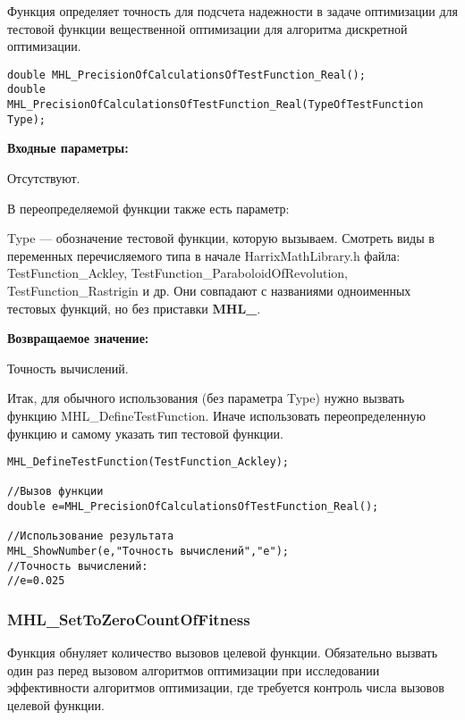 \documentclass[a4paper,12pt]{article}
\begin{document}
Функция определяет точность для подсчета надежности в задаче оптимизации для тестовой функции вещественной оптимизации для алгоритма дискретной оптимизации.


\begin{lstlisting}[label=code_syntax_MHL_PrecisionOfCalculationsOfTestFunction_Real,caption=Синтаксис]
double MHL_PrecisionOfCalculationsOfTestFunction_Real();
double MHL_PrecisionOfCalculationsOfTestFunction_Real(TypeOfTestFunction Type);
\end{lstlisting}

\textbf{Входные параметры:}

Отсутствуют.

В переопределяемой функции также есть параметр:
  
Type --- обозначение тестовой функции, которую вызываем.
Смотреть виды в переменных перечисляемого типа в начале HarrixMathLibrary.h файла: TestFunction\_Ackley, TestFunction\_ParaboloidOfRevolution, TestFunction\_Rastrigin и др. Они совпадают с названиями одноименных тестовых функций, но без приставки \textbf{MHL\_}.

\textbf{Возвращаемое значение:}
 
Точность вычислений.

Итак, для обычного использования (без параметра Type) нужно вызвать функцию MHL\_DefineTestFunction. Иначе использовать переопределенную функцию и самому указать тип тестовой функции.


\begin{lstlisting}[label=code_use_MHL_PrecisionOfCalculationsOfTestFunction_Real,caption=Пример использования]
MHL_DefineTestFunction(TestFunction_Ackley);

//Вызов функции
double e=MHL_PrecisionOfCalculationsOfTestFunction_Real();

//Использование результата
MHL_ShowNumber(e,"Точность вычислений","e");
//Точность вычислений:
//e=0.025
\end{lstlisting}

\subsubsection{MHL\_SetToZeroCountOfFitness}\label{MHL_SetToZeroCountOfFitness}

Функция обнуляет количество вызовов целевой функции. Обязательно вызвать один раз перед вызовом алгоритмов оптимизации при исследовании эффективности    алгоритмов оптимизации, где требуется контроль числа вызовов целевой функции.
\end{document}
